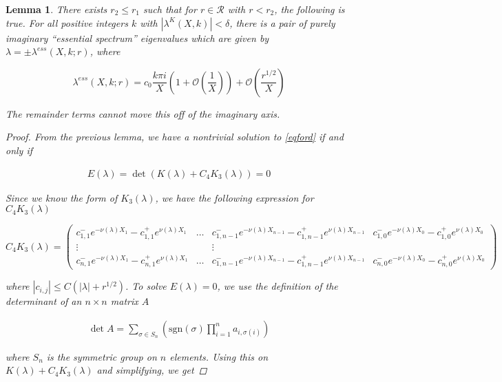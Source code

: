 \documentclass[12pt]{article}
\newtheorem{lemma}{Lemma}
\begin{document}
\begin{lemma}\label{essspeclemma}
There exists $r_2 \leq r_1$ such that for $r \in \mathcal{R}$ with $r < r_2$, the following is true. For all positive integers $k$ with $|\lambda^K(X,k)| < \delta$, there is a pair of purely imaginary ``essential spectrum'' eigenvalues which are given by $\lambda = \pm \lambda^{ess}(X,k; r)$, where

\begin{equation}\label{lambdaess}
\lambda^{ess}(X, k; r) = c_0 \frac{k \pi i }{X} \left( 1 + \mathcal{O}\left( \frac{1}{X} \right)\right) + \mathcal{O}\left( \frac{r^{1/2}}{X} \right)
\end{equation}

The remainder terms cannot move this off of the imaginary axis.

\begin{proof}
From the previous lemma, we have a nontrivial solution to \eqref{eqford} if and only if 

\begin{align*}
E(\lambda) = \det (K(\lambda) + C_4 K_3(\lambda)) = 0
\end{align*}

Since we know the form of $K_3(\lambda)$, we have the following expression for $C_4 K_3(\lambda)$

\[
C_4 K_3(\lambda) = 
\begin{pmatrix}
c_{1,1}^- e^{-\nu(\lambda)X_1} - c_{1,1}^+ e^{\nu(\lambda)X_1} 
& \dots & 
c_{1, n-1}^- e^{-\nu(\lambda)X_{n-1}} - c_{1,n-1}^+ e^{\nu(\lambda)X_{n-1}} &
c_{1,0}^- e^{-\nu(\lambda)X_0} - c_{1,0}^+ e^{\nu(\lambda)X_0}  \\
\vdots & & \vdots & \\
c_{n,1}^- e^{-\nu(\lambda)X_1} - c_{n,1}^+ e^{\nu(\lambda)X_1}
& \dots & 
c_{1, n-1}^- e^{-\nu(\lambda)X_{n-1}} - c_{1,n-1}^+ e^{\nu(\lambda)X_{n-1}} &
c_{n,0}^- e^{-\nu(\lambda)X_0} - c_{n,0}^+ e^{\nu(\lambda)X_0} 
\end{pmatrix}
\]

where $|c_{i,j}| \leq C(|\lambda| + r^{1/2})$. To solve $E(\lambda) = 0$, we use the definition of the determinant of an $n \times n$ matrix $A$

\begin{align*}
\det A = \sum_{\sigma \in S_n} \left( \text{sgn}(\sigma) \prod_{i=1}^n a_{i, \sigma(i)} \right)
\end{align*}

where $S_n$ is the symmetric group on $n$ elements. Using this on $K(\lambda) + C_4 K_3(\lambda)$ and simplifying, we get


\end{proof}
\end{lemma}
\end{document}
